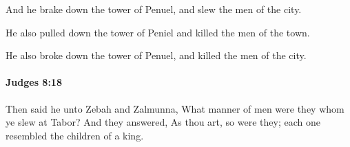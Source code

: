 			\begin{versebox}
					\item[BHS] 
					\item[ASV] And he brake down the tower of Penuel, and slew the men of the city.
					\item[NIV] He also pulled down the tower of Peniel and killed the men of the town.
					\item[NRSV] He also broke down the tower of Penuel, and killed the men of the city.
			\end{versebox}

		\paragraph{Judges 8:18} %
			\label{JUDGES-8-18}

			Then said he unto Zebah and Zalmunna, What manner of men were they whom ye slew at Tabor? And they answered, As thou art, so were they; each one resembled the children of a king.

